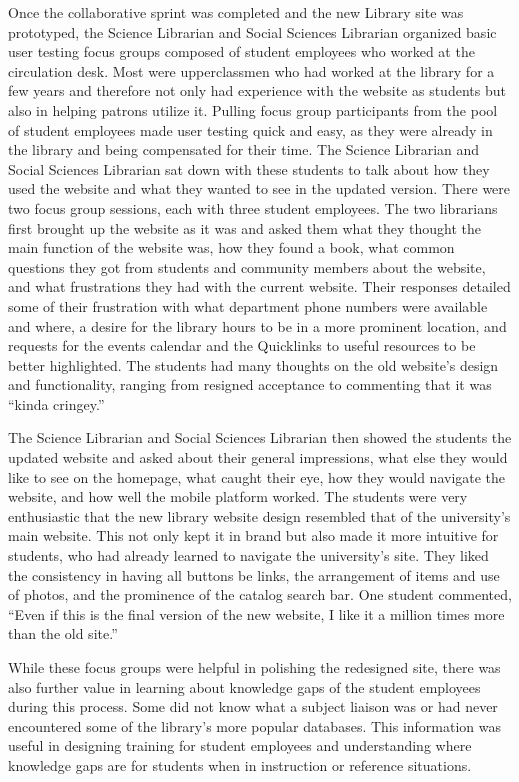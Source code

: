 \documentclass{book}
\begin{document}
Once the collaborative sprint was completed and the new Library site was
prototyped, the Science Librarian and Social Sciences Librarian organized
basic user testing focus groups composed of student employees who worked at
the circulation desk. Most were upperclassmen who had worked at the library
for a few years and therefore not only had experience with the website as
students but also in helping patrons utilize it. Pulling focus group
participants from the pool of student employees made user testing quick and
easy, as they were already in the library and being compensated for their
time. The Science Librarian and Social Sciences Librarian sat down with these
students to talk about how they used the website and what they wanted to see
in the updated version. There were two focus group sessions, each with three
student employees. The two librarians first brought up the website as it was
and asked them what they thought the main function of the website was, how
they found a book, what common questions they got from students and community
members about the website, and what frustrations they had with the current
website. Their responses detailed some of their frustration with what
department phone numbers were available and where, a desire for the library
hours to be in a more prominent location, and requests for the events calendar
and the Quicklinks to useful resources to be better highlighted. The students
had many thoughts on the old website's design and functionality, ranging from
resigned acceptance to commenting that it was ``kinda cringey.''

The Science Librarian and Social Sciences Librarian then showed the students
the updated website and asked about their general impressions, what else they
would like to see on the homepage, what caught their eye, how they would
navigate the website, and how well the mobile platform worked. The students
were very enthusiastic that the new library website design resembled that of
the university's main website. This not only kept it in brand but also made it
more intuitive for students, who had already learned to navigate the
university's site. They liked the consistency in having all buttons be links,
the arrangement of items and use of photos, and the prominence of the catalog
search bar. One student commented, ``Even if this is the final version of the
new website, I like it a million times more than the old site.''

While these focus groups were helpful in polishing the redesigned site, there
was also further value in learning about knowledge gaps of the student
employees during this process. Some did not know what a subject liaison was or
had never encountered some of the library's more popular databases. This
information was useful in designing training for student employees and
understanding where knowledge gaps are for students when in instruction or
reference situations.
\end{document}
